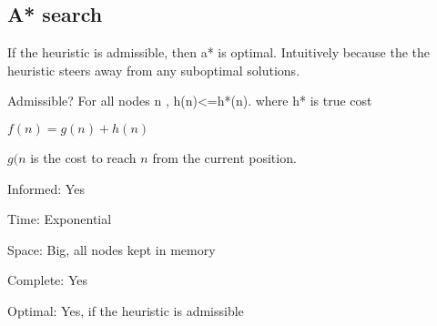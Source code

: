 
\subsection{A* search}

If the heuristic is admissible, then a* is optimal. Intuitively because the the heuristic steers away from any suboptimal solutions.

Admissible? For all nodes n , h(n)<=h*(n). where h* is true cost

\(f(n)=g(n)+h(n)\)

\(g(n\) is the cost to reach \(n\) from the current position.

Informed: Yes

Time: Exponential

Space: Big, all nodes kept in memory

Complete: Yes

Optimal: Yes, if the heuristic is admissible

